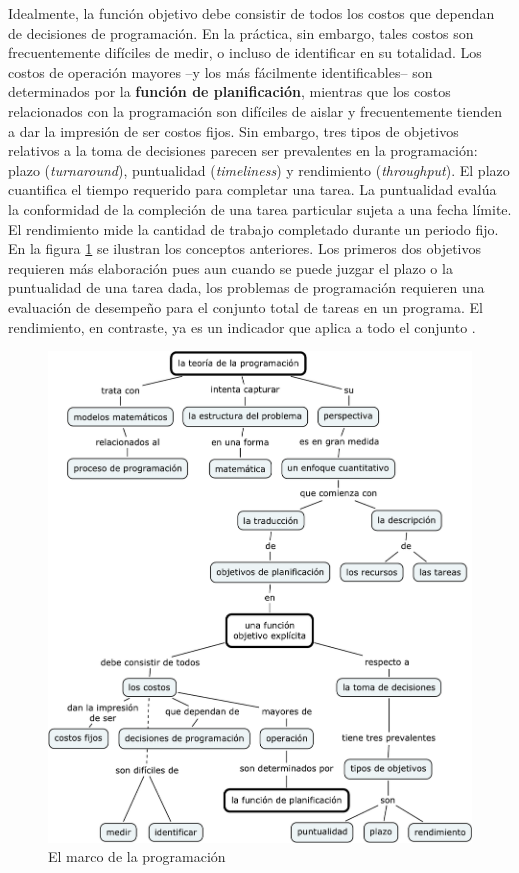 \documentclass[spanish,draft,12pt,headsepline,footsepline,paper=letter]{scrreprt}
\begin{document}
Idealmente, la función objetivo debe consistir de todos los costos que dependan de decisiones de programación. En la práctica, sin embargo, tales costos son frecuentemente difíciles de medir, o incluso de identificar en su totalidad. Los costos de operación mayores –y los más fácilmente identificables– son determinados por la \textbf{función de planificación}, mientras que los costos relacionados con la programación son difíciles de aislar y frecuentemente tienden a dar la impresión de ser costos fijos. Sin embargo, tres tipos de objetivos relativos a la toma de decisiones parecen ser prevalentes en la programación: plazo (\textit{turnaround}), puntualidad (\textit{timeliness}) y rendimiento (\textit{throughput}). El plazo cuantifica el tiempo requerido para completar una tarea. La puntualidad evalúa la conformidad de la compleción de una tarea particular sujeta a una fecha límite. El rendimiento mide la cantidad de trabajo completado durante un periodo fijo. En la figura \ref{fig:marco_programacion} se ilustran los conceptos anteriores. Los primeros dos objetivos requieren más elaboración pues aun cuando se puede juzgar el plazo o la puntualidad de una tarea dada, los problemas de programación requieren una evaluación de desempeño para el conjunto total de tareas en un programa. El rendimiento, en contraste, ya es un indicador que aplica a todo el conjunto \citep[p.~4]{Baker2009}.

\begin{figure}[hbtp]
\centering
\includegraphics[height=.90\textheight]{media/marco_programacion.pdf}
\caption[El marco de la programación]{El marco de la programación}
\label{fig:marco_programacion}
\end{figure}
\end{document}
